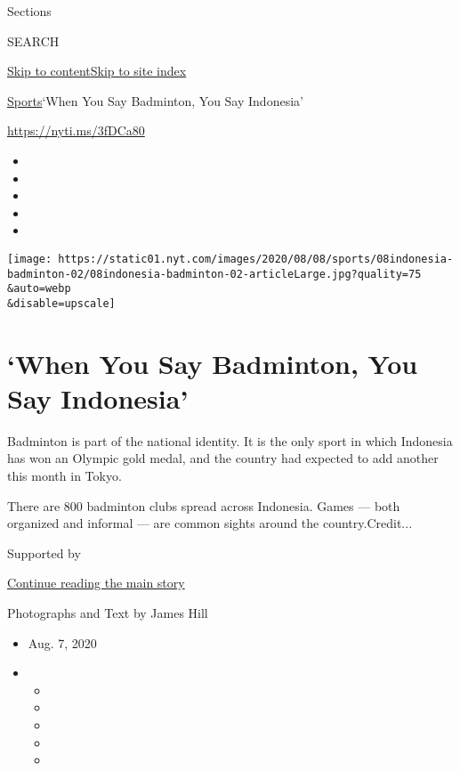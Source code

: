Sections

SEARCH

\protect\hyperlink{site-content}{Skip to
content}\protect\hyperlink{site-index}{Skip to site index}

\href{/section/sports}{Sports}\textbar{}`When You Say Badminton, You Say
Indonesia'

\href{https://nyti.ms/3fDCa80}{https://nyti.ms/3fDCa80}

\begin{itemize}
\item
\item
\item
\item
\item
\end{itemize}

\texttt{[image: https://static01.nyt.com/images/2020/08/08/sports/08indonesia-badminton-02/08indonesia-badminton-02-articleLarge.jpg?quality=75\\\&auto=webp\\\&disable=upscale]}

\hypertarget{when-you-say-badminton-you-say-indonesia}{%
\section{`When You Say Badminton, You Say
Indonesia'}\label{when-you-say-badminton-you-say-indonesia}}

Badminton is part of the national identity. It is the only sport in
which Indonesia has won an Olympic gold medal, and the country had
expected to add another this month in Tokyo.

There are 800 badminton clubs spread across Indonesia. Games --- both
organized and informal --- are common sights around the
country.Credit...

Supported by

\protect\hyperlink{after-sponsor}{Continue reading the main story}

Photographs and Text by James Hill

\begin{itemize}
\item
  Aug. 7, 2020
\item
  \begin{itemize}
  \item
  \item
  \item
  \item
  \item
  \end{itemize}
\end{itemize}

